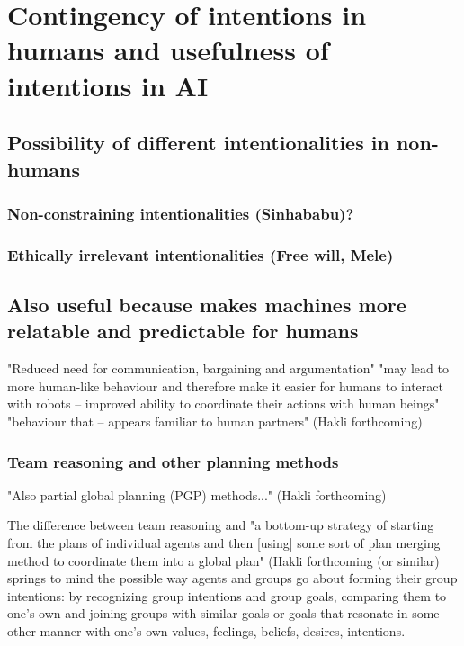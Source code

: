 \section{Contingency of intentions in humans and usefulness of intentions in AI}


\subsection{Possibility of different intentionalities in non-humans}


\subsubsection{Non-constraining intentionalities (Sinhababu)?}


\subsubsection{Ethically irrelevant intentionalities (Free will, Mele)}


\subsection{Also useful because makes machines more relatable and predictable for humans}

"Reduced need for communication, bargaining and argumentation" "may lead to more human-like behaviour and therefore make it easier for humans to interact with robots – improved ability to coordinate their actions with human beings" "behaviour that -- appears familiar to human partners" (Hakli forthcoming)

\subsubsection{Team reasoning and other planning methods}
"Also partial global planning (PGP) methods..." (Hakli forthcoming)

The difference between team reasoning and "a bottom-up strategy of starting from the plans of individual agents and then [using] some sort of plan merging method to coordinate them into a global plan" (Hakli forthcoming (or similar) springs to mind the possible way agents and groups go about forming their group intentions: by recognizing group intentions and group goals, comparing them to one's own and joining groups with similar goals or goals that resonate in some other manner with one's own values, feelings, beliefs, desires, intentions.


